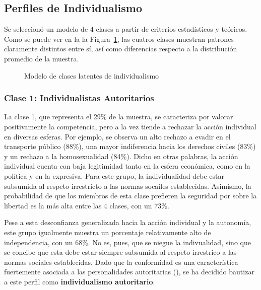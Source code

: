 \documentclass[
  12pt,
  letterpaper,
  DIV=11,
  numbers=noendperiod]{scrartcl}
\makeatletter
\newcommand*\pandocbounded[1]{%
  \sbox\pandoc@box{#1}%
  \Gscale@div\@tempa{\textheight}{\dimexpr\ht\pandoc@box+\dp\pandoc@box\relax}%
  \Gscale@div\@tempb{\linewidth}{\wd\pandoc@box}%
  \ifdim\@tempb\p@<\@tempa\p@\let\@tempa\@tempb\fi%
  \ifdim\@tempa\p@<\p@\scalebox{\@tempa}{\usebox\pandoc@box}%
  \else\usebox{\pandoc@box}%
  \fi%
}
\makeatother
\begin{document}
\subsection{Perfiles de
Individualismo}\label{perfiles-de-individualismo}

Se seleccionó un modelo de 4 clases a partir de criterios estadísticos y
teóricos. Como se puede ver en la la Figura~\ref{fig-lca}, las cuatros
clases muestran patrones claramente distintos entre sí, así como
diferencias respecto a la distribución promedio de la muestra.

\begin{figure}[H]

\centering{

\pandocbounded{\texttt{[image: paper\_files/figure-pdf/fig-lca-1.pdf]}}

}

\caption{\label{fig-lca}Modelo de clases latentes de individualismo}

\end{figure}%

\subsubsection{Clase 1: Individualistas
Autoritarios}\label{clase-1-individualistas-autoritarios}

La clase 1, que representa el 29\% de la muestra, se caracteriza por
valorar positivamente la competencia, pero a la vez tiende a rechazar la
acción individual en diversas esferas. Por ejemplo, se observa un alto
rechazo a evadir en el transporte público (88\%), una mayor indiferencia
hacia los derechos civiles (83\%) y un rechazo a la homosexualidad
(84\%). Dicho en otras palabras, la acción individual cuenta con baja
legitimidad tanto en la esfera económica, como en la política y en la
expresiva. Para este grupo, la individualidad debe estar subsumida al
respeto irrestricto a las normas socailes establecidas. Asimismo, la
probabilidad de que los miembros de esta clase prefieren la seguridad
por sobre la libertad es la más alta entre las 4 clases, con un 73\%.

Pese a esta desconfianza generalizada hacia la acción individual y la
autonomía, este grupo igualmente muestra un porcentaje relativamente
alto de independencia, con un 68\%. No es, pues, que se niegue la
indivualidad, sino que se concibe que esta debe estar siempre subsumida
al respeto irrestrico a las normas sociales establecidas. Dado que la
conformidad es una característica fuertemente asociada a las
personalidades autoritarias (), se ha decidido bautizar a este perfil como
\textbf{individualismo autoritario}.
\end{document}
